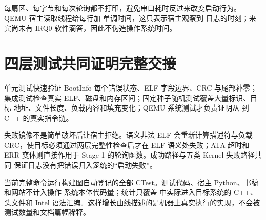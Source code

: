 每扇区、每字节和每次轮询都不打印，避免串口耗时反过来改变启动行为。QEMU
宿主读取线程给每行加 \code{[QEMU][T+...ms]} 单调时间，这只表示宿主观察到
日志的时刻；来宾尚未有 IRQ0 软件滴答，因此不伪造操作系统时间。

\section{四层测试共同证明完整交接}

单元测试快速验证 BootInfo 每个错误状态、ELF 字段边界、CRC 与尾部补零；
集成测试检查真实 ELF、磁盘和内存区间；固定种子随机测试覆盖大量标识、目标
地址、文件长度、负载内容和填充变化；QEMU 系统测试才负责证明从
 到 C++  的真实指令链。

失败镜像不是简单破坏后让宿主拒绝。语义非法 ELF 会重新计算描述符与负载
CRC，使目标必须通过两层完整性检查后才在 ELF 语义处失败；ATA 超时和 ERR
变体则直接作用于 Stage 1 的轮询函数。成功路径与五类 Kernel 失败路径共同
保证日志没有把错误归入笼统的“启动失败”。

当前完整命令运行构建图自动登记的全部 CTest。测试代码、宿主 Python、书稿和网站不计入操作
系统本体代码量；统计只覆盖  中实际进入目标系统的 C++、
头文件和 Intel 语法汇编。这样增长曲线描述的是机器上真实执行的实现，不会被
测试数量和文档篇幅稀释。
